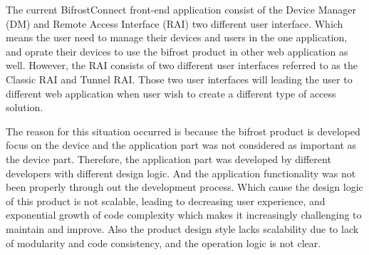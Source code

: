 
The current BifrostConnect front-end application consist of the Device Manager (DM) 
and Remote Access Interface (RAI) two different user interface.
Which means the user need to manage their devices and users in the one application, 
and oprate their devices to use the bifrost product in other web application as well. 
However, the RAI consists of two different user interfaces referred to as the Classic RAI and Tunnel RAI. 
Those two user interfaces will leading the user to different web application 
when user wish to create a different type of access solution.

The reason for this situation occurred is because the bifrost product is developed focus on the device 
and the application part was not considered as important as the device part. 
Therefore, the application part was developed by different developers with different design logic.
And the application functionality was not been properly through out the development process. 
Which cause the design logic of this product is not scalable, leading to decreasing user experience, 
and exponential growth of code complexity which makes it increasingly challenging to maintain and improve. 
Also the product design style lacks scalability due to lack of modularity and code consistency, 
and the operation logic is not clear.